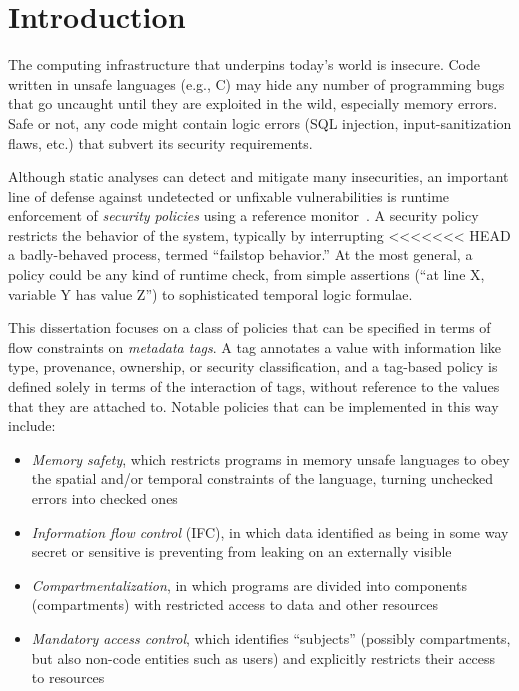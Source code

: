 \documentclass{report}
\begin{document}
\chapter{Introduction}

The computing infrastructure that underpins today's world is insecure. Code written
in unsafe languages (e.g., C) may hide any number of programming bugs that go uncaught
until they are exploited in the wild, especially memory errors. Safe or not, any code
might contain logic errors (SQL injection, input-sanitization flaws, etc.) that subvert
its security requirements.

Although static analyses can detect and mitigate many insecurities, an important line of
defense against undetected or unfixable vulnerabilities is runtime enforcement of
{\em security policies} using a reference monitor~\cite{Anderson72:PlanningStudy}.
A security policy restricts the behavior of the system, typically by interrupting
<<<<<<< HEAD
a badly-behaved process, termed ``failstop behavior.'' At the most general, a policy could be
any kind of runtime check, from simple assertions (``at line X, variable Y has value Z'') to
sophisticated temporal logic formulae.

This dissertation focuses on a class of policies that can be specified in terms of flow constraints
on \emph{metadata tags}. A tag annotates a value with information like type, provenance,
ownership, or security classification, and a tag-based policy is defined solely in terms of
the interaction of tags, without reference to the values that they are attached to.
Notable policies that can be implemented in this way include:

\begin{itemize}
\item {\em Memory safety}, which restricts programs in memory unsafe languages to obey
  the spatial and/or temporal constraints of the language, turning unchecked errors into
  checked ones
\item {\em Information flow control} (IFC), in which data identified as being in some way secret
  or sensitive is preventing from leaking on an externally visible
\item {\em Compartmentalization}, in which programs are divided into components (compartments)
  with restricted access to data and other resources
\item {\em Mandatory access control}, which identifies ``subjects'' (possibly compartments,
  but also non-code entities such as users) and explicitly restricts their access to resources
\end{itemize}
\end{document}
